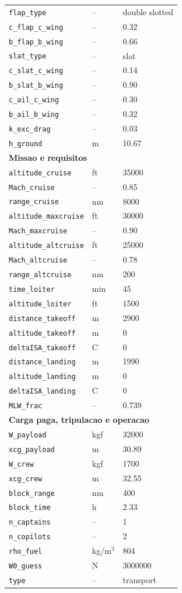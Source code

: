 \begin{longtable}{lll}
\texttt{flap\_type} & -- & double slotted \\
\texttt{c\_flap\_c\_wing} & -- & 0.32 \\
\texttt{b\_flap\_b\_wing} & -- & 0.66 \\
\texttt{slat\_type} & -- & slat \\
\texttt{c\_slat\_c\_wing} & -- & 0.14 \\
\texttt{b\_slat\_b\_wing} & -- & 0.90 \\
\texttt{c\_ail\_c\_wing} & -- & 0.30 \\
\texttt{b\_ail\_b\_wing} & -- & 0.32 \\
\texttt{k\_exc\_drag} & -- & 0.03 \\
\texttt{h\_ground} & m & 10.67 \\
\midrule
\multicolumn{3}{l}{\textbf{Missao e requisitos}} \\
\midrule
\texttt{altitude\_cruise} & ft & 35000 \\
\texttt{Mach\_cruise} & -- & 0.85 \\
\texttt{range\_cruise} & nm & 8000 \\
\texttt{altitude\_maxcruise} & ft & 30000 \\
\texttt{Mach\_maxcruise} & -- & 0.90 \\
\texttt{altitude\_altcruise} & ft & 25000 \\
\texttt{Mach\_altcruise} & -- & 0.78 \\
\texttt{range\_altcruise} & nm & 200 \\
\texttt{time\_loiter} & min & 45 \\
\texttt{altitude\_loiter} & ft & 1500 \\
\texttt{distance\_takeoff} & m & 2900 \\
\texttt{altitude\_takeoff} & m & 0 \\
\texttt{deltaISA\_takeoff} & C & 0 \\
\texttt{distance\_landing} & m & 1990 \\
\texttt{altitude\_landing} & m & 0 \\
\texttt{deltaISA\_landing} & C & 0 \\
\texttt{MLW\_frac} & -- & 0.739 \\
\midrule
\multicolumn{3}{l}{\textbf{Carga paga, tripulacao e operacao}} \\
\midrule
\texttt{W\_payload} & kgf & 32000 \\
\texttt{xcg\_payload} & m & 30.89 \\
\texttt{W\_crew} & kgf & 1700 \\
\texttt{xcg\_crew} & m & 32.55 \\
\texttt{block\_range} & nm & 400 \\
\texttt{block\_time} & h & 2.33 \\
\texttt{n\_captains} & -- & 1 \\
\texttt{n\_copilots} & -- & 2 \\
\texttt{rho\_fuel} & kg/m$^3$ & 804 \\
\texttt{W0\_guess} & N & 3000000 \\
\texttt{type} & -- & transport \\
\bottomrule
\end{longtable}